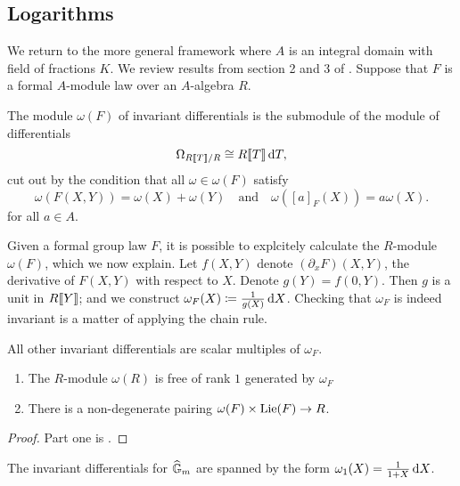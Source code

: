 \documentclass[../main.tex]{subfiles}
\begin{document}

\subsection{Logarithms} %
\label{sub:Logarithms}
We return to the more general framework where $A$ is an integral domain with 
field of fractions $K$. We review results from section
2 and 3 of \cite{hopkins1994equivariant}. 
Suppose that $F$ is a formal $A$-module law over an $A$-algebra $R$. 

\begin{defi}
  The module $\omega(F)$ of invariant differentials is the submodule of the module of 
  differentials
  \begin{equation*}
    \Omega_{R\llbracket T \rrbracket/R} \cong R\llbracket T \rrbracket \, \mathrm{d} T,
  \end{equation*}
  cut out by the condition that all $\omega \in \omega(F)$ satisfy 
  \begin{equation}\label{eq:diffcond}
    \omega(F(X,Y)) = \omega(X) + \omega(Y)\quad \text{and} \quad \omega([a]_F(X)) = a\omega(X).
  \end{equation} 
  for all $a \in A$. 
\end{defi}

Given a formal group law $F$, it is possible to explcitely calculate the
$R$-module $\omega(F)$, which we now explain. Let $f(X,Y)$ denote
$(\partial_x F)(X,Y)$, the derivative of $F(X,Y)$ with respect to $X$. Denote
$g(Y) = f(0,Y)$. Then $g$ is a unit in $R\llbracket Y \rrbracket$; and we construct
$\omega_F(X) \coloneqq \frac 1{g(X)} \, \mathrm{d} X$. Checking that $\omega_F$ is indeed
invariant is a matter of applying the chain rule.

All other invariant differentials are scalar multiples of $\omega_F$. 
\begin{prop}
  \begin{enumerate}
    \item The $R$-module $\omega(R)$ is free of rank $1$ generated by $\omega_F$ 
    \item There is a non-degenerate pairing $\omega(F) \times \operatorname{Lie}(F) \to R$.
  \end{enumerate}
\begin{proof}
  Part one is \cite[Proposition 2.2]{hopkins1994equivariant}. 
\end{proof}
\end{prop}

\begin{xpl}
  The invariant differentials for $\widehat{\mathbb{G}}_m$ are spanned by the form 
  $\omega_1(X) = \frac 1{1+X} \, \mathrm{d} X$. 
\end{xpl}
\end{document}
